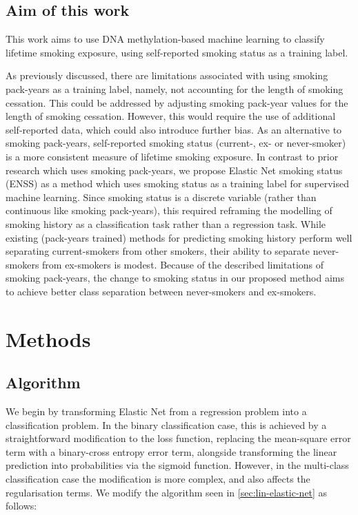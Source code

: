 \documentclass{article} %
\begin{document}
\subsection{Aim of this work}
This work aims to use DNA methylation-based machine learning to classify lifetime smoking exposure, using self-reported smoking status as a training label.

As previously discussed, there are limitations associated with using smoking pack-years as a training label, namely, not accounting for the length of smoking cessation. This could be addressed by adjusting smoking pack-year values for the length of smoking cessation. However, this would require the use of additional self-reported data, which could also introduce further bias. As an alternative to smoking pack-years, self-reported smoking status (current-, ex- or never-smoker) is a more consistent measure of lifetime smoking exposure. In contrast to prior research which uses smoking pack-years, we propose Elastic Net smoking status (ENSS) as a method which uses smoking status as a training label for supervised machine learning.  Since smoking status is a discrete variable (rather than continuous like smoking pack-years), this required reframing the modelling of smoking history as a classification task rather than a regression task. While existing (pack-years trained) methods for predicting smoking history perform well separating current-smokers from other smokers, their ability to separate never-smokers from ex-smokers is modest. Because of the described limitations of smoking pack-years, the change to smoking status in our proposed method aims to achieve better class separation between never-smokers and ex-smokers.



\newpage
\section{Methods}

\subsection{Algorithm} \label{sec:algorithm}
We begin by transforming Elastic Net from a regression problem into a classification problem. In the binary classification case, this is achieved by a straightforward modification to the loss function, replacing the mean-square error term with a binary-cross entropy error term, alongside transforming the linear prediction into probabilities via the sigmoid function. However, in the multi-class classification case the modification is more complex, and also affects the regularisation terms. We modify the algorithm seen in \ref{sec:lin-elastic-net} as follows:
\end{document}
